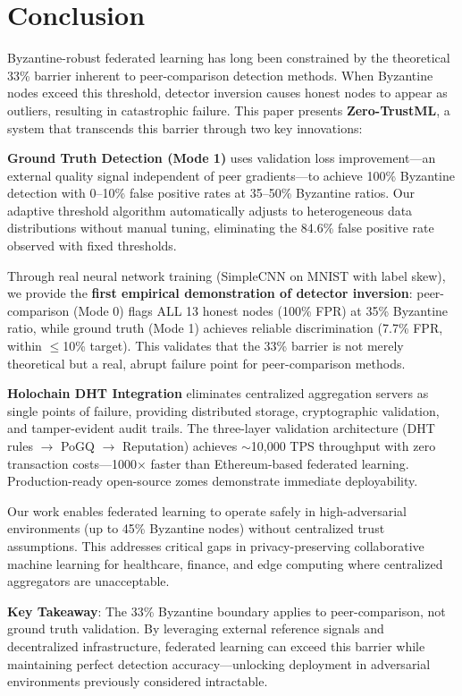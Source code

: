 \section{Conclusion}
\label{sec:conclusion}

Byzantine-robust federated learning has long been constrained by the theoretical 33\% barrier inherent to peer-comparison detection methods. When Byzantine nodes exceed this threshold, detector inversion causes honest nodes to appear as outliers, resulting in catastrophic failure. This paper presents \textbf{Zero-TrustML}, a system that transcends this barrier through two key innovations:

\textbf{Ground Truth Detection (Mode 1)} uses validation loss improvement---an external quality signal independent of peer gradients---to achieve 100\% Byzantine detection with 0--10\% false positive rates at 35--50\% Byzantine ratios. Our adaptive threshold algorithm automatically adjusts to heterogeneous data distributions without manual tuning, eliminating the 84.6\% false positive rate observed with fixed thresholds.

Through real neural network training (SimpleCNN on MNIST with label skew), we provide the \textbf{first empirical demonstration of detector inversion}: peer-comparison (Mode 0) flags ALL 13 honest nodes (100\% FPR) at 35\% Byzantine ratio, while ground truth (Mode 1) achieves reliable discrimination (7.7\% FPR, within $\leq$10\% target). This validates that the 33\% barrier is not merely theoretical but a real, abrupt failure point for peer-comparison methods.

\textbf{Holochain DHT Integration} eliminates centralized aggregation servers as single points of failure, providing distributed storage, cryptographic validation, and tamper-evident audit trails. The three-layer validation architecture (DHT rules $\rightarrow$ PoGQ $\rightarrow$ Reputation) achieves $\sim$10,000 TPS throughput with zero transaction costs---1000$\times$ faster than Ethereum-based federated learning. Production-ready open-source zomes demonstrate immediate deployability.

Our work enables federated learning to operate safely in high-adversarial environments (up to 45\% Byzantine nodes) without centralized trust assumptions. This addresses critical gaps in privacy-preserving collaborative machine learning for healthcare, finance, and edge computing where centralized aggregators are unacceptable.

\textbf{Key Takeaway}: The 33\% Byzantine boundary applies to peer-comparison, not ground truth validation. By leveraging external reference signals and decentralized infrastructure, federated learning can exceed this barrier while maintaining perfect detection accuracy---unlocking deployment in adversarial environments previously considered intractable.

